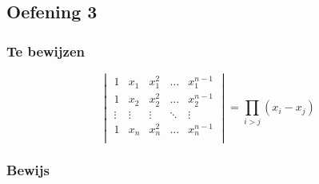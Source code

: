 \documentclass[lineaire_algebra_oplossingen.tex]{subfiles}
\begin{document}
\subsection{Oefening 3}
\subsubsection*{Te bewijzen}
\[
\begin{vmatrix}
1 & x_1 & x_1^2 & \hdots & x_1^{n-1}\\
1 & x_2 & x_2^2 & \hdots & x_2^{n-1}\\
\vdots &\vdots &\vdots & \ddots & \vdots \\
1 & x_n & x_n^2 & \hdots & x_n^{n-1}\\
\end{vmatrix}
=
\prod_{i>j}(x_i-x_j)
\]
\subsubsection*{Bewijs}
\end{document}
